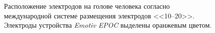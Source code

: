 \documentclass[12pt,fleqn]{article}
\begin{document}
	\begin{figure}[H]
		\caption{Расположение электродов на голове человека согласно международной системе размещения электродов <<10--20>>. Электроды устройства {\it Emotiv EPOC} выделены оранжевым цветом.}
	\label{electrode_map}
	\end{figure}

\end{document}
